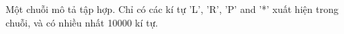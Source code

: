 Một chuỗi mô tả tập hợp. Chỉ có các kí tự 'L', 'R', 'P' and '*' xuất hiện trong chuỗi, và có nhiều nhất 10000 kí tự.  

\